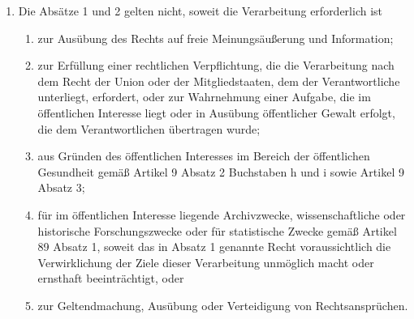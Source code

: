 \begin{enumerate}[label=(\arabic*)]
            \item Die Absätze 1 und 2 gelten nicht, soweit die Verarbeitung erforderlich ist
                \begin{enumerate}[label=\alph*)]
                    \item zur Ausübung des Rechts auf freie Meinungsäußerung und Information;
                    \item zur Erfüllung einer rechtlichen Verpflichtung, die die Verarbeitung nach dem Recht der Union oder der Mitgliedstaaten, dem der Verantwortliche unterliegt, erfordert, oder zur Wahrnehmung einer Aufgabe, die im öffentlichen Interesse liegt oder in Ausübung öffentlicher Gewalt erfolgt, die dem Verantwortlichen übertragen wurde;
                    \item aus Gründen des öffentlichen Interesses im Bereich der öffentlichen Gesundheit gemäß Artikel 9 Absatz 2 Buchstaben h und i sowie Artikel 9 Absatz 3; 
                    \item für im öffentlichen Interesse liegende Archivzwecke, wissenschaftliche oder historische Forschungszwecke oder für statistische Zwecke gemäß Artikel 89 Absatz 1, soweit das in Absatz 1 genannte Recht voraussichtlich die Verwirklichung der Ziele dieser Verarbeitung unmöglich macht oder ernsthaft beeinträchtigt, oder 
                    \item zur Geltendmachung, Ausübung oder Verteidigung von Rechtsansprüchen. 
                \end{enumerate}
        \end{enumerate}

